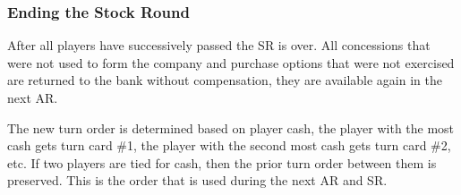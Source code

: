 \documentclass[a4paper,twocolumn]{article}
\begin{document}
\subsubsection{Ending the Stock Round}
After all players have successively passed the SR is over. All concessions that
were not used to form the company and purchase options that were not exercised
are returned to the bank without compensation, they are available again in the
next AR.

The new turn order is determined based on player cash, the player with the most
cash gets turn card \#1, the player with the second most cash gets turn card
\#2, etc. If two players are tied for cash, then the prior turn order between
them is preserved. This is the order that is used during the next AR and SR.
\end{document}
